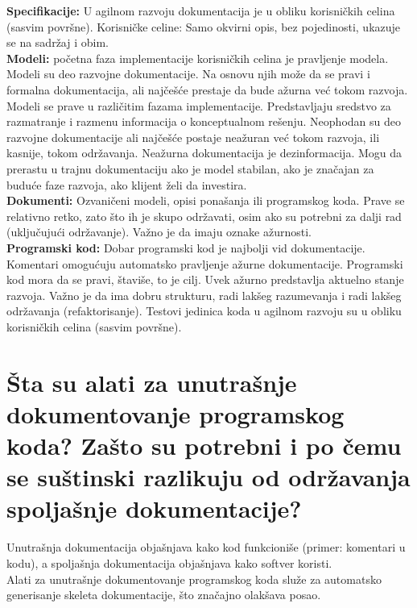 \documentclass[a4paper]{article}
\begin{document}
  \textbf{Specifikacije:} U agilnom razvoju dokumentacija je u obliku korisničkih celina 
  (sasvim površne). Korisničke celine: Samo okvirni opis, bez pojedinosti, ukazuje se na sadržaj i 
  obim.\\

  \textbf{Modeli:} početna faza implementacije korisničkih celina je pravljenje modela. 
  Modeli su deo razvojne dokumentacije. Na osnovu njih može da se pravi i formalna dokumentacija, 
  ali najčešće prestaje da bude ažurna već tokom razvoja. Modeli se prave u različitim fazama 
  implementacije. Predstavljaju sredstvo za razmatranje i razmenu informacija o konceptualnom rešenju. 
  Neophodan su deo razvojne dokumentacije ali najčešće postaje neažuran već tokom razvoja, ili 
  kasnije, tokom održavanja. Neažurna dokumentacija je dezinformacija. Mogu da prerastu u trajnu 
  dokumentaciju ako je model stabilan, ako je značajan za buduće faze razvoja, ako klijent želi da 
  investira.\\

  \textbf{Dokumenti:} Ozvaničeni modeli, opisi ponašanja ili programskog koda. Prave se relativno 
  retko, zato što ih je skupo održavati, osim ako su potrebni za dalji rad (uključujući održavanje). 
  Važno je da imaju oznake ažurnosti.\\

  \textbf{Programski kod:} Dobar programski kod je najbolji vid dokumentacije. 
  Komentari omogućuju automatsko pravljenje ažurne dokumentacije.
  Programski kod mora da se pravi, štaviše, to je cilj. Uvek ažurno predstavlja aktuelno 
  stanje razvoja. Važno je da ima dobru strukturu, radi lakšeg razumevanja i radi lakšeg održavanja 
  (refaktorisanje). Testovi jedinica koda u agilnom razvoju su u obliku korisničkih 
  celina (sasvim površne).
  
\section{Šta su alati za unutrašnje dokumentovanje programskog koda? Zašto su potrebni i po čemu 
         se suštinski razlikuju od održavanja spoljašnje dokumentacije?}
  Unutrašnja dokumentacija objašnjava kako kod funkcioniše (primer: komentari u kodu), a
  spoljašnja dokumentacija objašnjava kako softver koristi.\\

  Alati za unutrašnje dokumentovanje programskog koda služe za automatsko generisanje
  skeleta dokumentacije, što značajno olakšava posao.
\end{document}
